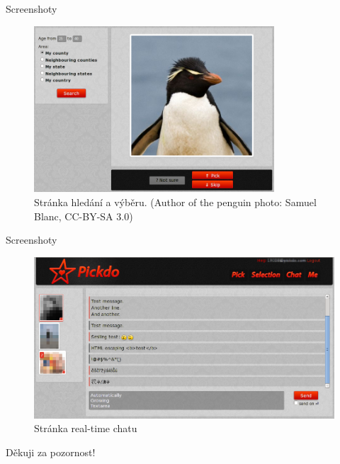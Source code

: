 \documentclass[xcolor=dvipsnames]{beamer}
\begin{document}
	\begin{frame}{Screenshoty}
		\begin{figure}[h]
	  \centering
	    \includegraphics[width=0.8\textwidth]{../tex/screen-search.png}
		  \caption{Stránka hledání a výběru. (Author of the penguin photo: Samuel Blanc, CC-BY-SA 3.0)}
		  \label{fig:screen-search}
	  \end{figure}
	\end{frame}
	\begin{frame}{Screenshoty}
			\begin{figure}[h]
	  \centering
	    \includegraphics[width=1.0\textwidth]{../tex/screen-chat.png}
		  \caption{Stránka real-time chatu}
		  \label{fig:screen-chat}
	  \end{figure}
	\end{frame}
	
	\begin{frame}
		\begin{center}
			Děkuji za pozornost!
		\end{center}
	\end{frame}
\end{document}
